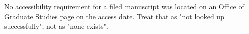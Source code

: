 %
	{No accessibility requirement for a filed manuscript was located on an
	 Office of Graduate Studies page on the access date. Treat that as "not
	 looked up successfully", not as "none exists".}

